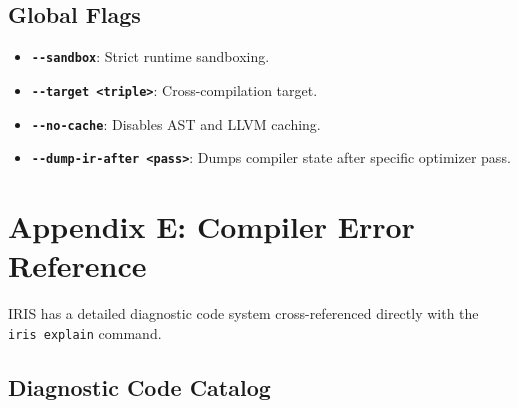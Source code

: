 \documentclass[
  english,
]{book}
\providecommand{\tightlist}{%
  \setlength{\itemsep}{0pt}\setlength{\parskip}{0pt}}
\begin{document}
\subsection{Global Flags}\label{global-flags}

\begin{itemize}
\tightlist
\item
  \textbf{\texttt{-\/-sandbox}}: Strict runtime sandboxing.
\item
  \textbf{\texttt{-\/-target\ \textless{}triple\textgreater{}}}:
  Cross-compilation target.
\item
  \textbf{\texttt{-\/-no-cache}}: Disables AST and LLVM caching.
\item
  \textbf{\texttt{-\/-dump-ir-after\ \textless{}pass\textgreater{}}}:
  Dumps compiler state after specific optimizer pass.
\end{itemize}

\section{Appendix E: Compiler Error
Reference}\label{appendix-e-compiler-error-reference}

IRIS has a detailed diagnostic code system cross-referenced directly
with the \texttt{iris\ explain} command.

\subsection{Diagnostic Code Catalog}\label{diagnostic-code-catalog}
\end{document}
